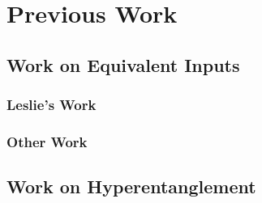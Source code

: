 \chapter{Previous Work}

\section{Work on Equivalent Inputs}
\subsection{Leslie's Work}
\subsection{Other Work}

\section{Work on Hyperentanglement}